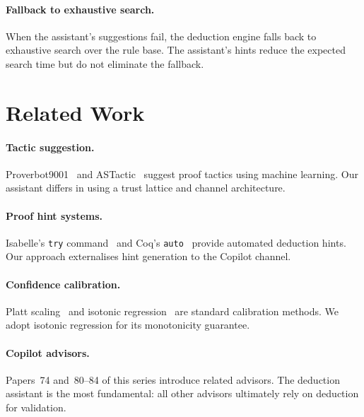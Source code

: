\documentclass[11pt]{article}
\begin{document}
\paragraph{Fallback to exhaustive search.}
When the assistant's suggestions fail, the deduction engine
falls back to exhaustive search over the rule base.  The
assistant's hints reduce the expected search time but do not
eliminate the fallback.

\section{Related Work}\label{sec:related}

\paragraph{Tactic suggestion.}
Proverbot9001~\cite{sanchez2020proverbot} and
ASTactic~\cite{yang2019learning} suggest proof tactics using
machine learning.  Our assistant differs in using a trust
lattice and channel architecture.

\paragraph{Proof hint systems.}
Isabelle's \texttt{try} command~\cite{wenzel2014isabelle}
and Coq's \texttt{auto}~\cite{bertot2004coq} provide
automated deduction hints.  Our approach externalises hint
generation to the Copilot channel.

\paragraph{Confidence calibration.}
Platt scaling~\cite{platt1999probabilities} and isotonic
regression~\cite{zadrozny2002transforming} are standard
calibration methods.  We adopt isotonic regression for its
monotonicity guarantee.

\paragraph{Copilot advisors.}
Papers~74 and~80--84 of this series introduce related
advisors.  The deduction assistant is the most fundamental:
all other advisors ultimately rely on deduction for
validation.

\end{document}
